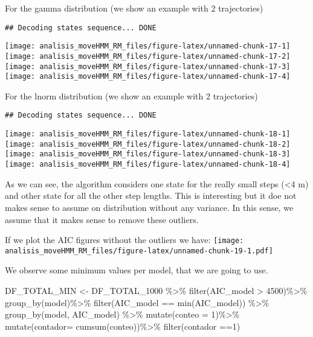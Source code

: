 \documentclass[
]{article}
\newenvironment{Shaded}{\begin{snugshade}}{\end{snugshade}}
\newcommand{\AttributeTok}[1]{\textcolor[rgb]{0.77,0.63,0.00}{#1}}
\newcommand{\DecValTok}[1]{\textcolor[rgb]{0.00,0.00,0.81}{#1}}
\newcommand{\FunctionTok}[1]{\textcolor[rgb]{0.00,0.00,0.00}{#1}}
\newcommand{\NormalTok}[1]{#1}
\newcommand{\OtherTok}[1]{\textcolor[rgb]{0.56,0.35,0.01}{#1}}
\newcommand{\SpecialCharTok}[1]{\textcolor[rgb]{0.00,0.00,0.00}{#1}}
\begin{document}
For the gamma distribution (we show an example with 2 trajectories)

\begin{verbatim}
## Decoding states sequence... DONE
\end{verbatim}

\texttt{[image: analisis\_moveHMM\_RM\_files/figure-latex/unnamed-chunk-17-1]}
\texttt{[image: analisis\_moveHMM\_RM\_files/figure-latex/unnamed-chunk-17-2]}
\texttt{[image: analisis\_moveHMM\_RM\_files/figure-latex/unnamed-chunk-17-3]}
\texttt{[image: analisis\_moveHMM\_RM\_files/figure-latex/unnamed-chunk-17-4]}

For the lnorm distribution (we show an example with 2 trajectories)

\begin{verbatim}
## Decoding states sequence... DONE
\end{verbatim}

\texttt{[image: analisis\_moveHMM\_RM\_files/figure-latex/unnamed-chunk-18-1]}
\texttt{[image: analisis\_moveHMM\_RM\_files/figure-latex/unnamed-chunk-18-2]}
\texttt{[image: analisis\_moveHMM\_RM\_files/figure-latex/unnamed-chunk-18-3]}
\texttt{[image: analisis\_moveHMM\_RM\_files/figure-latex/unnamed-chunk-18-4]}

As we can see, the algorithm considers one state for the really small
steps (\textless4 m) and other state for all the other step lengths.
This is interesting but it doe not makes sense to assume on distribution
without any variance. In this sense, we assume that it makes sense to
remove these outliers.

If we plot the AIC figures without the outliers we have:
\texttt{[image: analisis\_moveHMM\_RM\_files/figure-latex/unnamed-chunk-19-1.pdf]}

We observe some minimum values per model, that we are going to use.

\begin{Shaded}
\begin{Highlighting}[]
\NormalTok{DF\_TOTAL\_MIN }\OtherTok{\textless{}{-}}\NormalTok{ DF\_TOTAL\_1000 }\SpecialCharTok{\%\textgreater{}\%}
  \FunctionTok{filter}\NormalTok{(AIC\_model }\SpecialCharTok{\textgreater{}} \DecValTok{4500}\NormalTok{)}\SpecialCharTok{\%\textgreater{}\%}
  \FunctionTok{group\_by}\NormalTok{(model)}\SpecialCharTok{\%\textgreater{}\%}
  \FunctionTok{filter}\NormalTok{(AIC\_model }\SpecialCharTok{==} \FunctionTok{min}\NormalTok{(AIC\_model)) }\SpecialCharTok{\%\textgreater{}\%}
  \FunctionTok{group\_by}\NormalTok{(model, AIC\_model) }\SpecialCharTok{\%\textgreater{}\%}
  \FunctionTok{mutate}\NormalTok{(}\AttributeTok{conteo =} \DecValTok{1}\NormalTok{)}\SpecialCharTok{\%\textgreater{}\%}
  \FunctionTok{mutate}\NormalTok{(}\AttributeTok{contador=} \FunctionTok{cumsum}\NormalTok{(conteo))}\SpecialCharTok{\%\textgreater{}\%}
  \FunctionTok{filter}\NormalTok{(contador }\SpecialCharTok{==}\DecValTok{1}\NormalTok{)}
\end{Highlighting}
\end{Shaded}
\end{document}
